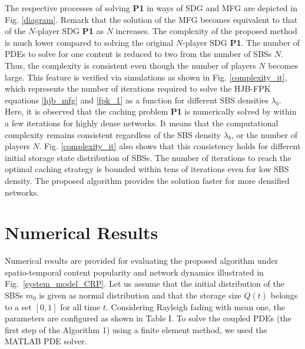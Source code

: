 \documentclass{book}
\begin{document}
            {The respective processes of solving \textbf{P1} in ways of SDG and MFG are depicted in Fig. \ref{diagram}.  
            Remark that the solution of the MFG becomes equivalent to that of the $N$-player SDG \textbf{P1} as $N$ increases.  
            The complexity of the proposed method is much lower compared to solving the original $N$-player SDG  \textbf{P1}. The number of PDEs to solve for one content is reduced to two from the number of SBSs $N$. Thus, the complexity is consistent even though the number of players $N$ becomes large. }
            {This feature is verified via simulations as shown in Fig. \ref{complexity_it}, which represents the number of iterations required to solve the HJB-FPK equations \eqref{hjb_mfg} and \eqref{fpk_1} as a function for different SBS densities $\lambda_b$. 
            Here, it is observed that the caching problem \textbf{P1} is numerically solved by within a few iterations for highly dense networks. It means that the computational complexity remains consistent regardless of the SBS density $\lambda_b$, or the number of players $N$. Fig. \ref{complexity_it} also shows that this consistency holds for different initial storage state distribution of SBSs. The number of iterations to reach the optimal caching strategy is bounded within tens of iterations even for low SBS density. The proposed algorithm provides the solution faster for more densified networks.}


            \section{Numerical Results}\label{C_numerical}







            Numerical results are provided for evaluating the proposed algorithm under spatio-temporal content popularity and network dynamics illustrated in Fig.~\ref{system_model_CRP}. 
            Let us assume that the initial distribution of the SBSs $m_0$ is given as normal distribution and that the storage size $Q(t)$ belongs to a set $[0,1]$ for all time $t$. Considering Rayleigh fading with mean one, the parameters are configured as shown in Table I.
            {To solve the coupled PDEs (the first step of the Algorithm 1) using a finite element method, we used the MATLAB PDE solver.}
            
\end{document}

